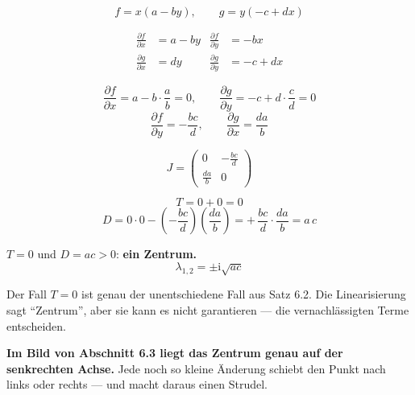 \begin{merksatz}
\[ f = x(a-by), \qquad g = y(-c+dx) \]

\begin{align*}
\frac{\partial f}{\partial x} &= a - by & \frac{\partial f}{\partial y} &= -bx\\
\frac{\partial g}{\partial x} &= dy & \frac{\partial g}{\partial y} &= -c + dx
\end{align*}

\[ \frac{\partial f}{\partial x} = a - b\cdot\frac{a}{b} = 0, \qquad \frac{\partial g}{\partial y} = -c + d\cdot\frac{c}{d} = 0 \]
\[ \frac{\partial f}{\partial y} = -\frac{bc}{d}, \qquad \frac{\partial g}{\partial x} = \frac{da}{b} \]

\[ J = \begin{pmatrix} 0 & -\frac{bc}{d}\\[4pt] \frac{da}{b} & 0 \end{pmatrix} \]

\[ T = 0 + 0 = 0 \]
\[ D = 0\cdot0 - \left(-\frac{bc}{d}\right)\left(\frac{da}{b}\right) = +\,\frac{bc}{d}\cdot\frac{da}{b} = a\,c \]

$T = 0$ und $D = ac > 0$: \textbf{ein Zentrum.}
\[ \lambda_{1,2} = \pm\mathrm{i}\sqrt{ac} \]

\begin{center}
\begin{minipage}{0.88\textwidth}
\end{minipage}
\end{center}

Der Fall $T = 0$ ist genau der unentschiedene Fall aus Satz 6.2. Die Linearisierung sagt \enquote{Zentrum}, aber sie kann es nicht garantieren --- die vernachlässigten Terme entscheiden.

\begin{center}
\begin{minipage}{0.9\textwidth}
\textbf{Im Bild von Abschnitt 6.3 liegt das Zentrum genau auf der senkrechten Achse.} Jede noch so kleine Änderung schiebt den Punkt nach links oder rechts --- und macht daraus einen Strudel.
\end{minipage}
\end{center}

\begin{center}
\begin{minipage}{0.88\textwidth}
\end{minipage}
\end{center}
\end{merksatz}

